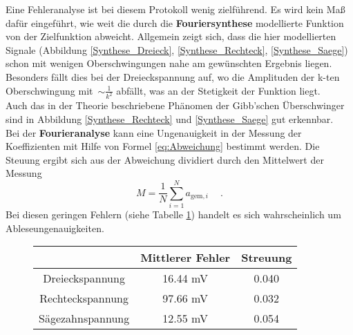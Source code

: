 Eine Fehleranalyse ist bei diesem Protokoll wenig zielführend. Es wird kein Maß dafür eingeführt, wie weit die durch die \textbf{Fouriersynthese} modellierte Funktion von der Zielfunktion abweicht. Allgemein zeigt sich, dass die hier modellierten Signale (Abbildung \ref{Synthese_Dreieck}, \ref{Synthese_Rechteck}, \ref{Synthese_Saege}) schon mit wenigen Oberschwingungen nahe am gewünschten Ergebnis liegen. Besonders fällt dies bei der Dreieckspannung auf, wo die Amplituden der k-ten Oberschwingung mit~$\sim \frac{1}{k^2}$ abfällt, was an der Stetigkeit der Funktion liegt. \\
Auch das in der Theorie beschriebene Phänomen der Gibb'schen Überschwinger sind in Abbildung \ref{Synthese_Rechteck} und \ref{Synthese_Saege} gut erkennbar. \\
Bei der \textbf{Fourieranalyse} kann eine Ungenauigkeit in der Messung der Koeffizienten mit Hilfe von Formel \eqref{eq:Abweichung} bestimmt werden. Die Steuung ergibt sich aus der Abweichung dividiert durch den Mittelwert der Messung
\begin{equation}
M = \frac{1}{N}  \sum_{i=1}^{N}  a_{\text{gem},i}\ \quad.
\end{equation} 
Bei diesen geringen Fehlern (siehe Tabelle \ref{tab:Fehler}) handelt es sich wahrscheinlich um Ableseungenauigkeiten.
\begin{figure}[h!]
	\centering
		\begin{tabular}{c|cc}
			 & Mittlerer Fehler & Streuung \\
			 \hline
			Dreieckspannung & 16.44 \si{\milli\volt} & 0.040 \\
			Rechteckspannung & 97.66 \si{\milli\volt} & 0.032 \\
			Sägezahnspannung & 12.55 \si{\milli\volt} & 0.054 \\
		\end{tabular}
		\label{tab:Fehler}
\end{figure}



